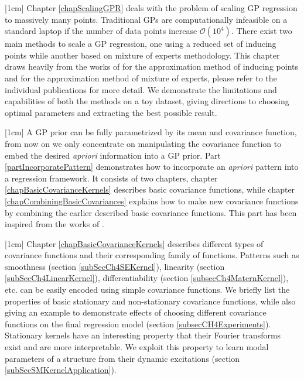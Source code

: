 [1cm]
Chapter \ref{chapScalingGPR} deals with the problem of scaling GP regression to massively many points. Traditional GPs are computationally infeasible on a standard laptop if the number of data points increase $\mathcal{O}(10^4)$. There exist two main methods to scale a GP regression, one using a reduced set of inducing points while another based on mixture of experts methodology. This chapter draws heavily from the works of \cite{quinonero2005unifying, seeger2003fast, Snelson06sparsegaussian, Titsias09variationallearning} for the approximation method of inducing points and \cite{DBLP:journals/corr/CaoF14, tresp2000bayesian, chen2009bagging, deisenroth2015distributed} for the approximation method of mixture of experts, please refer to the individual publications for more detail. We demonstrate the limitations and capabilities of both the methods on a toy dataset, giving directions to choosing optimal parameters and extracting the best possible result.  

[1cm]
A GP prior can be fully parametrized by its mean and covariance function, from now on we only concentrate on manipulating the covariance function to embed the desired \textit{apriori} information into a GP prior. Part \ref{partIncorporatePattern} demonstrates how to incorporate an \textit{apriori} pattern into a regression framework. It consists of two chapters, chapter \ref{chapBasicCovarianceKernels} describes basic covariance functions, while chapter \ref{chapCombiningBasicCovariances} explains how to make new covariance functions by combining the earlier described basic covariance functions. This part has been inspired from the works of \cite{bishop2006pattern, mackay2003information, duvenaud-thesis-2014, wilson2014thesis, lloyd2014automatic, durrande2001etude, durrande2013anova}. 

[1cm]
Chapter \ref{chapBasicCovarianceKernels} describes different types of covariance functions and their corresponding family of functions. Patterns such as smoothness (section \ref{subSecCh4SEKernel}), linearity (section \ref{subSecCh4LinearKernel}), differentiability (section \ref{subsecCh4MaternKernel}), etc. can be easily encoded using simple covariance functions. We briefly list the properties of basic stationary and non-stationary covariance functions, while also giving an example to demonstrate effects of choosing different covariance functions on the final regression model (section \ref{subsecCH4Experiments}). Stationary kernels have an interesting property that their Fourier transforms exist and are more interpretable. We exploit this property to learn modal parameters of a structure from their dynamic excitations (section \ref{subSecSMKernelApplication}). 

